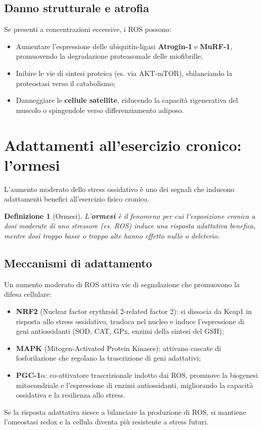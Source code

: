 \documentclass[12pt,a4paper]{report}
\newtheorem{definizione}{Definizione}[section]
\begin{document}
\subsection{Danno strutturale e atrofia}
Se presenti a concentrazioni eccessive, i ROS possono:
\begin{itemize}
\item Aumentare l'espressione delle ubiquitin-ligasi \textbf{Atrogin-1} e \textbf{MuRF-1}, promuovendo la degradazione proteasomale delle miofibrille;
\item Inibire le vie di sintesi proteica (es. via AKT-mTOR), sbilanciando la proteostasi verso il catabolismo;
\item Danneggiare le \textbf{cellule satellite}, riducendo la capacità rigenerativa del muscolo o spingendole verso differenziamento adiposo.
\end{itemize}

\section{Adattamenti all'esercizio cronico: l'ormesi}
L'aumento moderato dello stress ossidativo è uno dei segnali che inducono adattamenti benefici all'esercizio fisico cronico.

\begin{definizione}[Ormesi]
L'\textbf{ormesi} è il fenomeno per cui l'esposizione cronica a dosi moderate di uno stressore (es. ROS) induce una risposta adattativa benefica, mentre dosi troppo basse o troppo alte hanno effetto nullo o deleterio.
\end{definizione}

\subsection{Meccanismi di adattamento}
Un aumento moderato di ROS attiva vie di segnalazione che promuovono la difesa cellulare:
\begin{itemize}
\item \textbf{NRF2} (Nuclear factor erythroid 2-related factor 2): si dissocia da Keap1 in risposta allo stress ossidativo, trasloca nel nucleo e induce l'espressione di geni antiossidanti (SOD, CAT, GPx, enzimi della sintesi del GSH);
\item \textbf{MAPK} (Mitogen-Activated Protein Kinases): attivano cascate di fosforilazione che regolano la trascrizione di geni adattativi;
\item \textbf{PGC-1\(\alpha\)}: co-attivatore trascrizionale indotto dai ROS, promuove la biogenesi mitocondriale e l'espressione di enzimi antiossidanti, migliorando la capacità ossidativa e la resilienza allo stress.
\end{itemize}
Se la risposta adattativa riesce a bilanciare la produzione di ROS, si mantiene l'omeostasi redox e la cellula diventa più resistente a stress futuri.
\end{document}
